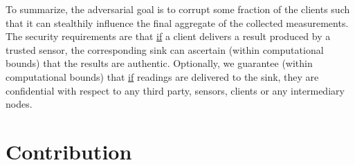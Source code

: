 To summarize, the adversarial goal is to corrupt some fraction of the clients such that it can stealthily influence the final aggregate of the collected measurements. The security requirements are that \underline{if} a client delivers a result produced by a trusted sensor, the corresponding sink can ascertain (within computational bounds) that the results are authentic. Optionally, we guarantee (within computational bounds) that \underline{if} readings are delivered to the sink, they are confidential with respect to any third party, sensors, clients or any intermediary nodes.


\section*{Contribution}

